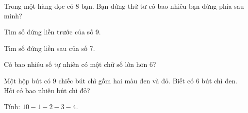 \begin{ex}
Trong một hàng dọc có 8 bạn. Bạn đứng thứ tư có bao nhiêu bạn đứng phía sau mình?
\end{ex}

\begin{ex}
Tìm số đứng liền trước của số 9.
\end{ex}

\begin{ex}
Tìm số đứng liền sau của số 7.
\end{ex}

\begin{ex}
Có bao nhiêu số tự nhiên có một chữ số lớn hơn 6?
\end{ex}

\begin{ex}
Một hộp bút có 9 chiếc bút chì gồm hai màu đen và đỏ. Biết có 6 bút chì đen. Hỏi có bao nhiêu bút chì đỏ?
\end{ex}

\begin{ex}
Tính: $10 - 1 - 2 - 3 - 4$.
\end{ex}
